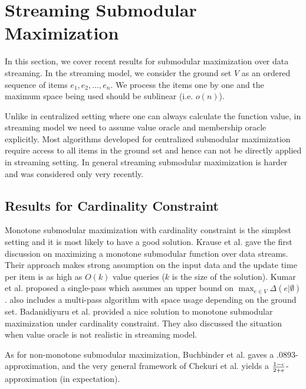\section{Streaming Submodular Maximization}
In this section, we cover recent results for submodular maximization over data streaming. In the streaming model, we consider the ground set $V$ as an ordered sequence of items $e_1, e_2, \ldots, e_n$. We process the items one by one and the maximum space being used should be sublinear (i.e. $o(n)$).


Unlike in centralized setting where one can always calculate the function value, in streaming model we need to assume value oracle and membership oracle explicitly.  Most algorithms developed for centralized submodular maximization require access to all items in the ground set and hence can not be directly applied in streaming setting. In general streaming submodular maximization is harder and was considered only very recently. 




\subsection{Results for  Cardinality Constraint}
Monotone submodular maximization with cardinality constraint is the simplest setting and it is most likely to have a good solution. Krause et al. \cite{KG10} gave the first discussion on maximizing a monotone submodular function over data streams. Their approach makes strong assumption on the input data and the update time per item is as high as $O(k)$ value queries ($k$ is the size of the solution).  Kumar et al. \cite{KMV+15} proposed a single-pass which assumes an upper bound on $\max_{e\in V}\Delta(e|\emptyset)$. \cite{KMV+15} also includes a multi-pass algorithm with space usage depending on the ground set. Badanidiyuru et al. \cite{BMK+14} provided a nice solution to monotone submodular maximization under cardinality constraint. They also discussed the situation when value oracle is not realistic in streaming model. 

As for non-monotone submodular maximization, Buchbinder et al. \cite{BFS15} gaves a $.0893$-approximation, and the very general framework of Chekuri et al. \cite{CGQ15} yields a $\frac{1-\epsilon}{2 + e}$-approximation (in expectation). 

